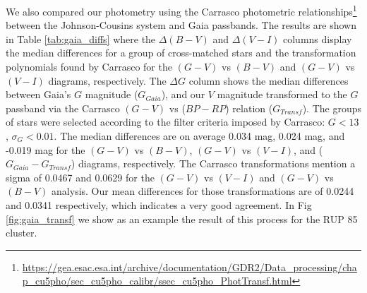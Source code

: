 \documentclass[draft]{aa}
\begin{document}
We also compared our photometry using the Carrasco photometric
relationships\footnote{\url{https://gea.esac.esa.int/archive/documentation/GDR2/Data_processing/chap_cu5pho/sec_cu5pho_calibr/ssec_cu5pho_PhotTransf.html}}
between the Johnson-Cousins system and Gaia passbands. The results are shown in
Table \ref{tab:gaia_diffs} where the $\Delta (B-V)$ and $\Delta (V-I)$ columns
display the median differences for a group of cross-matched stars and the
transformation polynomials found by Carrasco for the $(G-V)$ vs $(B-V)$ and
$(G-V)$ vs $(V-I)$ diagrams, respectively. The $\Delta G$ column shows the
median differences between Gaia's $G$ magnitude ($G_{Gaia}$), and our $V$
magnitude transformed to the $G$ passband via the Carrasco $(G-V)$ vs ($BP-RP$)
relation ($G_{Transf}$).
The groups of stars were selected according to the filter
criteria imposed by Carrasco: $G<13$, $\sigma_{G}<0.01$. The median differences
are on average 0.034 mag, 0.024 mag, and -0.019 mag for the $(G-V)$ vs $(B-V)$,
$(G-V)$ vs $(V-I)$, and ($G_{Gaia}-G_{Transf}$) diagrams, respectively.
The Carrasco transformations mention a sigma of 0.0467 and 0.0629 for the
$(G-V)$ vs $(V-I)$ and $(G-V)$ vs $(B-V)$ analysis. Our mean
differences for those transformations are of 0.0244 and 0.0341 respectively,
which indicates a very good agreement. In Fig \ref{fig:gaia_transf} we show as
an example the result of this process for the RUP 85 cluster.\\
\end{document}
